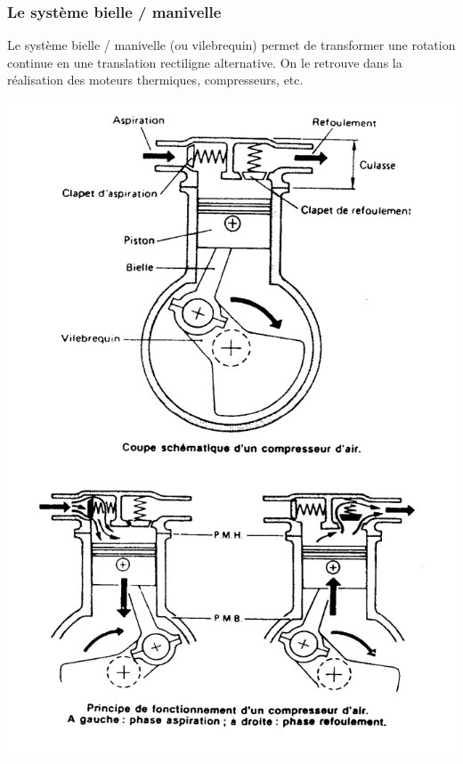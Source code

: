 \documentclass[11pt,oneside]{article}
\begin{document}
\subsubsection{Le système bielle / manivelle}

Le système bielle / manivelle (ou vilebrequin) permet de transformer une rotation continue en une translation rectiligne alternative. On le retrouve dans la réalisation des moteurs thermiques, compresseurs, etc.


\begin{minipage}[c]{.45\linewidth}
\begin{center}
\includegraphics[width=.9\textwidth]{png/fig_113}
\end{center}
\end{minipage}\hfill
\end{document}
